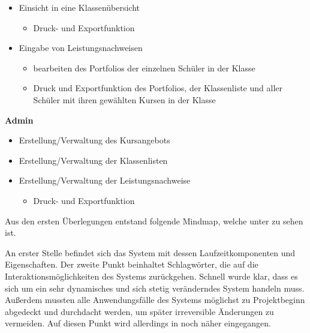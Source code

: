\begin{itemize}
  \item Einsicht in eine Klassenübersicht
  \begin{itemize}
    \item Druck- und Exportfunktion 
  \end{itemize}
  \item Eingabe von Leistungsnachweisen
  \begin{itemize}
    \item bearbeiten des Portfolios der einzelnen Schüler in der Klasse
    \item Druck und Exportfunktion des Portfolios, der Klassenliste und aller Schüler mit ihren gewählten Kursen in der Klasse
  \end{itemize}
\end{itemize}
 
\textbf{Admin}

\begin{itemize}
  \item Erstellung/Verwaltung des Kursangebots
  \item Erstellung/Verwaltung der Klassenlisten
  \item Erstellung/Verwaltung der Leistungsnachweise
  \begin{itemize}
    \item Druck- und Exportfunktion
  \end{itemize}
\end{itemize}

Aus den ersten Überlegungen entstand folgende Mindmap, welche unter  zu sehen ist.

An erster Stelle befindet sich das System mit dessen Laufzeitkomponenten und Eigenschaften. Der zweite Punkt beinhaltet Schlagwörter, die auf die Interaktionsmöglichkeiten des Systems zurückgehen. Schnell wurde klar, dass es sich um ein sehr dynamisches und sich stetig veränderndes System handeln muss. Außerdem mussten alle Anwendungsfälle des Systems möglichst zu Projektbeginn abgedeckt und durchdacht werden, um später irreversible Änderungen zu vermeiden. Auf diesen Punkt wird allerdings in  noch näher eingegangen.

